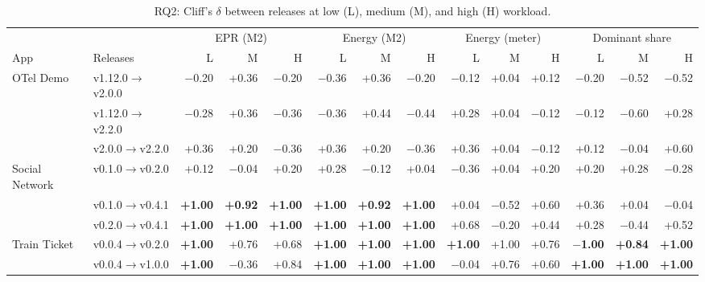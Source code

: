 \begin{table}[t]
\centering
\caption{RQ2: Cliff's $\delta$ between releases at low (L), medium (M), and high (H) workload.}
\label{tab:rq2-release}
\small
\setlength{\tabcolsep}{3pt}
\begin{tabular}{ll *{12}{r}}
\toprule
 & & \multicolumn{3}{c}{EPR (M2)} & \multicolumn{3}{c}{Energy (M2)} & \multicolumn{3}{c}{Energy (meter)} & \multicolumn{3}{c}{Dominant share} \\
\cmidrule(lr){3-5}\cmidrule(lr){6-8}\cmidrule(lr){9-11}\cmidrule(lr){12-14}
App & Releases & L & M & H & L & M & H & L & M & H & L & M & H \\
\midrule
OTel Demo & v1.12.0$\rightarrow$v2.0.0 & $-$0.20 & +0.36 & $-$0.20 & $-$0.36 & +0.36 & $-$0.20 & $-$0.12 & +0.04 & +0.12 & $-$0.20 & $-$0.52 & $-$0.52 \\
 & v1.12.0$\rightarrow$v2.2.0 & $-$0.28 & +0.36 & $-$0.36 & $-$0.36 & +0.44 & $-$0.44 & +0.28 & +0.04 & $-$0.12 & $-$0.12 & $-$0.60 & +0.28 \\
 & v2.0.0$\rightarrow$v2.2.0 & +0.36 & +0.20 & $-$0.36 & +0.36 & +0.20 & $-$0.36 & +0.36 & +0.04 & $-$0.12 & +0.12 & $-$0.04 & +0.60 \\
\midrule
Social Network & v0.1.0$\rightarrow$v0.2.0 & +0.12 & $-$0.04 & +0.20 & +0.28 & $-$0.12 & +0.04 & $-$0.36 & +0.04 & +0.20 & +0.20 & +0.28 & $-$0.28 \\
 & v0.1.0$\rightarrow$v0.4.1 & \cellcolor{SigShade}\textbf{+1.00} & \cellcolor{SigShade}\textbf{+0.92} & \cellcolor{SigShade}\textbf{+1.00} & \cellcolor{SigShade}\textbf{+1.00} & \cellcolor{SigShade}\textbf{+0.92} & \cellcolor{SigShade}\textbf{+1.00} & +0.04 & $-$0.52 & +0.60 & +0.36 & +0.04 & $-$0.04 \\
 & v0.2.0$\rightarrow$v0.4.1 & \cellcolor{SigShade}\textbf{+1.00} & \cellcolor{SigShade}\textbf{+1.00} & \cellcolor{SigShade}\textbf{+1.00} & \cellcolor{SigShade}\textbf{+1.00} & \cellcolor{SigShade}\textbf{+1.00} & \cellcolor{SigShade}\textbf{+1.00} & +0.68 & $-$0.20 & +0.44 & +0.28 & $-$0.44 & +0.52 \\
\midrule
Train Ticket & v0.0.4$\rightarrow$v0.2.0 & \cellcolor{SigShade}\textbf{+1.00} & +0.76 & +0.68 & \cellcolor{SigShade}\textbf{+1.00} & \cellcolor{SigShade}\textbf{+1.00} & \cellcolor{SigShade}\textbf{+1.00} & \cellcolor{SigShade}\textbf{+1.00} & +1.00 & +0.76 & \cellcolor{SigShade}\textbf{$-$1.00} & \cellcolor{SigShade}\textbf{+0.84} & \cellcolor{SigShade}\textbf{+1.00} \\
 & v0.0.4$\rightarrow$v1.0.0 & \cellcolor{SigShade}\textbf{+1.00} & $-$0.36 & +0.84 & \cellcolor{SigShade}\textbf{+1.00} & \cellcolor{SigShade}\textbf{+1.00} & \cellcolor{SigShade}\textbf{+1.00} & $-$0.04 & +0.76 & +0.60 & \cellcolor{SigShade}\textbf{+1.00} & \cellcolor{SigShade}\textbf{+1.00} & \cellcolor{SigShade}\textbf{+1.00} \\

\end{tabular}
\end{table}
